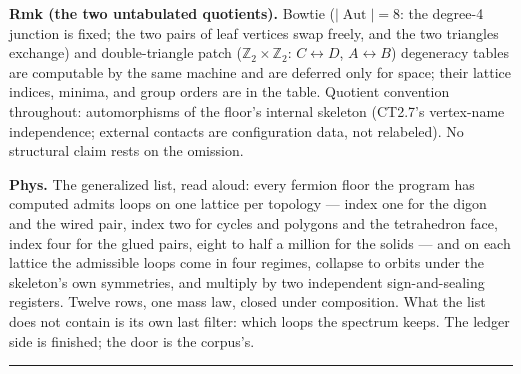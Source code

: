 \begin{theorem}
\textbf{Rmk (the two untabulated quotients).} Bowtie ($|\operatorname{Aut}|=8$: the degree-4 junction is fixed; the two pairs of leaf vertices swap freely, and the two triangles exchange) and double-triangle patch ($\mathbb Z_2\times\mathbb Z_2$: $C\leftrightarrow D$, $A\leftrightarrow B$) degeneracy tables are computable by the same machine and are deferred only for space; their lattice indices, minima, and group orders are in the table. Quotient convention throughout: automorphisms of the floor's internal skeleton (CT2.7's vertex-name independence; external contacts are configuration data, not relabeled). No structural claim rests on the omission.

\textbf{Phys.} The generalized list, read aloud: every fermion floor the program has computed admits loops on one lattice per topology — index one for the digon and the wired pair, index two for cycles and polygons and the tetrahedron face, index four for the glued pairs, eight to half a million for the solids — and on each lattice the admissible loops come in four regimes, collapse to orbits under the skeleton's own symmetries, and multiply by two independent sign-and-sealing registers. Twelve rows, one mass law, closed under composition. What the list does not contain is its own last filter: which loops the spectrum keeps. The ledger side is finished; the door is the corpus's.

\vspace{2pt}\noindent\rule{\textwidth}{0.4pt}\vspace{2pt}

\end{theorem}


